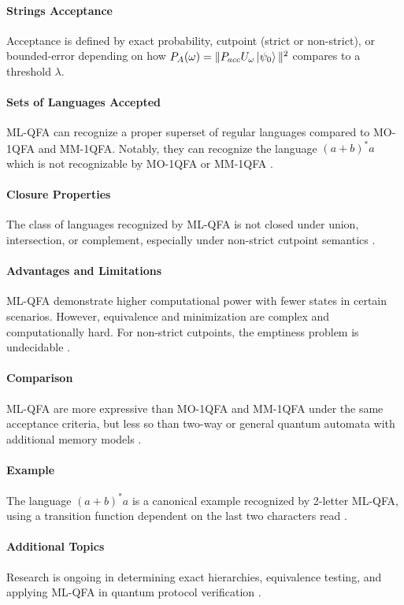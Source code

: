 \paragraph{Strings Acceptance}
Acceptance is defined by exact probability, cutpoint (strict or non-strict), or bounded-error depending on how $P_A(\omega) = \| P_{acc} U_\omega \ket{\psi_0} \|^2$ compares to a threshold $\lambda$.

\paragraph{Sets of Languages Accepted}
ML-QFA can recognize a proper superset of regular languages compared to MO-1QFA and MM-1QFA. Notably, they can recognize the language $(a + b)^*a$ which is not recognizable by MO-1QFA or MM-1QFA \cite{belovs2007multi}.

\paragraph{Closure Properties}
The class of languages recognized by ML-QFA is not closed under union, intersection, or complement, especially under non-strict cutpoint semantics \cite{qiu2009hierarchy}.

\paragraph{Advantages and Limitations}
ML-QFA demonstrate higher computational power with fewer states in certain scenarios. However, equivalence and minimization are complex and computationally hard. For non-strict cutpoints, the emptiness problem is undecidable \cite{qiu2008decidability}.

\paragraph{Comparison}
ML-QFA are more expressive than MO-1QFA and MM-1QFA under the same acceptance criteria, but less so than two-way or general quantum automata with additional memory models \cite{qiu2011multi}.

\paragraph{Example}
The language $(a + b)^*a$ is a canonical example recognized by 2-letter ML-QFA, using a transition function dependent on the last two characters read \cite{belovs2007multi}.

\paragraph{Additional Topics}
Research is ongoing in determining exact hierarchies, equivalence testing, and applying ML-QFA in quantum protocol verification \cite{lin2012equivalence, qiu2008decidability}.

